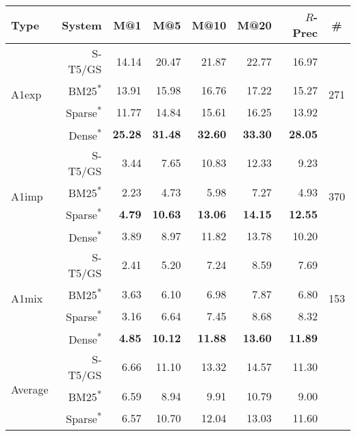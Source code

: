\documentclass[11pt]{article}
\begin{document}
\begin{table*}[]
    \centering
    \begin{tabular}{l|r|r|r|r|r|r|c}
     Type &  System &  M@1 &  M@5 &  M@10 &  M@20 &  $R$-Prec &  \# \\
    \hline
    \hline
    \multirow{4}{3em}{A1exp} &    S-T5/GS &  14.14 &  20.47 &   21.87 &   22.77 &        16.97 &      \multirow{4}{2em}{271} \\
     &    BM25\textsuperscript{*} &  13.91 &  15.98 &   16.76 &   17.22 &        15.27 &       \\
     &    Sparse\textsuperscript{*} &  11.77 &  14.84 &   15.61 &   16.25 &        13.92 &       \\
     &    Dense\textsuperscript{*} &  \textbf{25.28} &  \textbf{31.48} &   \textbf{32.60} &   \textbf{33.30} &        \textbf{28.05} &       \\
    \hline
    \multirow{4}{3em}{A1imp} &    S-T5/GS &   3.44 &   7.65 &   10.83 &   12.33 &         9.23 &      \multirow{4}{2em}{370} \\
     &    BM25\textsuperscript{*} &   2.23 &   4.73 &    5.98 &    7.27 &         4.93 &       \\
     &    Sparse\textsuperscript{*} &   \textbf{4.79} &  \textbf{10.63} &   \textbf{13.06} &   \textbf{14.15} &        \textbf{12.55} &       \\
     &    Dense\textsuperscript{*} &   3.89 &   8.97 &   11.82 &   13.78 &        10.20 &       \\
    \hline
    \multirow{4}{3em}{A1mix} &    S-T5/GS &   2.41 &   5.20 &    7.24 &    8.59 &         7.69 &      \multirow{4}{2em}{153} \\
     &    BM25\textsuperscript{*} &   3.63 &   6.10 &    6.98 &    7.87 &         6.80 &       \\
     &    Sparse\textsuperscript{*} &   3.16 &   6.64 &    7.45 &    8.68 &         8.32 &       \\
     &    Dense\textsuperscript{*} &   \textbf{4.85} &  \textbf{10.12} &   \textbf{11.88} &   \textbf{13.60} &        \textbf{11.89} &       \\
    \hline
    \hline
     \multirow{4}{2em}{Average} &    S-T5/GS &   6.66 &  11.10 &   13.32 &   14.57 &        11.30 &         \\
      &    BM25\textsuperscript{*} &   6.59 &   8.94 &    9.91 &   10.79 &         9.00 &          \\
      &    Sparse\textsuperscript{*} &   6.57 &  10.70 &   12.04 &   13.03 &        11.60 &         \\

\end{tabular}
\end{table*}
\end{document}
